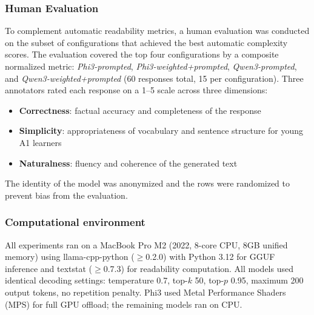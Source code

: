 \documentclass[10pt, a4paper]{article}
\begin{document}

\subsubsection{Human Evaluation}
To complement automatic readability metrics, a human evaluation was conducted on the subset of configurations that achieved the best automatic complexity scores. The evaluation covered the top four configurations by a composite normalized metric: \textit{Phi3-prompted}, \textit{Phi3-weighted+prompted}, \textit{Qwen3-prompted}, and \textit{Qwen3-weighted+prompted} (60 responses total, 15 per configuration). Three annotators rated each response on a 1--5 scale across three dimensions:
\begin{itemize}
    \item \textbf{Correctness}: factual accuracy and completeness of the response
    \item \textbf{Simplicity}: appropriateness of vocabulary and sentence structure for young A1 learners
    \item \textbf{Naturalness}: fluency and coherence of the generated text
\end{itemize}
The identity of the model was anonymized and the rows were randomized to prevent bias from the evaluation.

\subsubsection{Computational environment} All experiments ran on a MacBook Pro M2 (2022, 8-core CPU, 8GB unified memory) using llama-cpp-python ($\geq$0.2.0) with Python 3.12 for GGUF inference and textstat ($\geq$0.7.3) for readability computation. All models used identical decoding settings: temperature 0.7, top-$k$ 50, top-$p$ 0.95, maximum 200 output tokens, no repetition penalty. Phi3 used Metal Performance Shaders (MPS) for full GPU offload; the remaining models ran on CPU.
\end{document}
